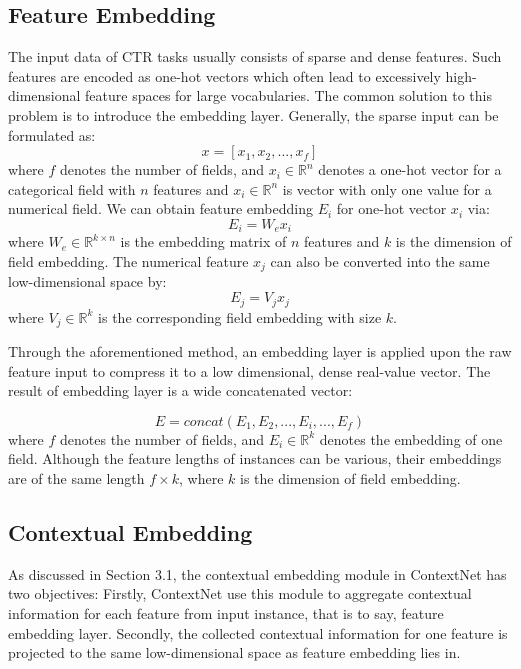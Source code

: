 \documentclass[sigconf]{acmart}
\begin{document}
\subsection{Feature Embedding}
The input data of CTR tasks usually consists of sparse and dense features. Such features are  encoded as one-hot vectors which often lead to excessively high-dimensional feature spaces for large vocabularies. The common solution to this problem is to introduce the embedding layer. Generally, the sparse input can be formulated as:
\begin{equation}
  x = [x_1, x_2, ..., x_f]
\end{equation}
where $f$ denotes the number of fields, and $x_i \in \mathbb{R}^n$ denotes a one-hot vector for a categorical  field with $n$ features and $x_i \in \mathbb{R}^n$ is vector with only one value for a numerical  field. We can obtain feature embedding $E_i$ for one-hot vector $x_i$ via:
\begin{equation}
  E_i = W_ex_i
\end{equation}
where $W_e \in \mathbb{R}^{k\times n}$ is the embedding matrix of $n$ features and $k$ is the dimension of field embedding. The numerical feature $x_j$ can also be converted into the same low-dimensional space by:
\begin{equation}
  E_j = V_jx_j
\end{equation}
where $V_j \in \mathbb{R}^k$ is the corresponding field embedding with size $k$.


Through the aforementioned method, an embedding layer is applied upon the raw feature input to compress it to a low dimensional, dense real-value vector. The result of embedding layer is a wide concatenated vector:

\begin{equation}
  E = concat(E_1, E_2, ..., E_i, ..., E_f)
\end{equation}
where $f$ denotes the number of fields, and $E_i \in \mathbb{R}^k$ denotes the embedding of one field. Although the feature lengths of instances can be various, their embeddings are of the same length $f\times k$, where $k$ is the dimension of field embedding.

\subsection{Contextual Embedding}
As discussed in Section 3.1, the contextual embedding module in ContextNet has two objectives: Firstly, ContextNet use this module  to aggregate contextual information for each feature from input instance, that is to say, feature embedding layer. Secondly, the collected contextual information for one feature is projected to the same low-dimensional space as feature embedding lies in.
\end{document}
